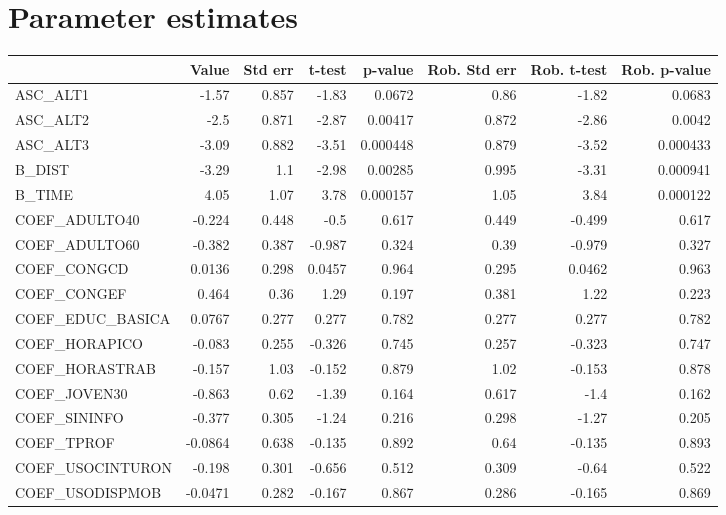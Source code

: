 \section{Parameter estimates}
\begin{tabular}{lrrrrrrr}
\toprule
{} &   Value &  Std err &  t-test &  p-value &  Rob. Std err &  Rob. t-test &  Rob. p-value \\
\midrule
ASC\_ALT1         &   -1.57 &    0.857 &   -1.83 &   0.0672 &          0.86 &        -1.82 &        0.0683 \\
ASC\_ALT2         &    -2.5 &    0.871 &   -2.87 &  0.00417 &         0.872 &        -2.86 &        0.0042 \\
ASC\_ALT3         &   -3.09 &    0.882 &   -3.51 & 0.000448 &         0.879 &        -3.52 &      0.000433 \\
B\_DIST           &   -3.29 &      1.1 &   -2.98 &  0.00285 &         0.995 &        -3.31 &      0.000941 \\
B\_TIME           &    4.05 &     1.07 &    3.78 & 0.000157 &          1.05 &         3.84 &      0.000122 \\
COEF\_ADULTO40    &  -0.224 &    0.448 &    -0.5 &    0.617 &         0.449 &       -0.499 &         0.617 \\
COEF\_ADULTO60    &  -0.382 &    0.387 &  -0.987 &    0.324 &          0.39 &       -0.979 &         0.327 \\
COEF\_CONGCD      &  0.0136 &    0.298 &  0.0457 &    0.964 &         0.295 &       0.0462 &         0.963 \\
COEF\_CONGEF      &   0.464 &     0.36 &    1.29 &    0.197 &         0.381 &         1.22 &         0.223 \\
COEF\_EDUC\_BASICA &  0.0767 &    0.277 &   0.277 &    0.782 &         0.277 &        0.277 &         0.782 \\
COEF\_HORAPICO    &  -0.083 &    0.255 &  -0.326 &    0.745 &         0.257 &       -0.323 &         0.747 \\
COEF\_HORASTRAB   &  -0.157 &     1.03 &  -0.152 &    0.879 &          1.02 &       -0.153 &         0.878 \\
COEF\_JOVEN30     &  -0.863 &     0.62 &   -1.39 &    0.164 &         0.617 &         -1.4 &         0.162 \\
COEF\_SININFO     &  -0.377 &    0.305 &   -1.24 &    0.216 &         0.298 &        -1.27 &         0.205 \\
COEF\_TPROF       & -0.0864 &    0.638 &  -0.135 &    0.892 &          0.64 &       -0.135 &         0.893 \\
COEF\_USOCINTURON &  -0.198 &    0.301 &  -0.656 &    0.512 &         0.309 &        -0.64 &         0.522 \\
COEF\_USODISPMOB  & -0.0471 &    0.282 &  -0.167 &    0.867 &         0.286 &       -0.165 &         0.869 \\
\bottomrule
\end{tabular}

